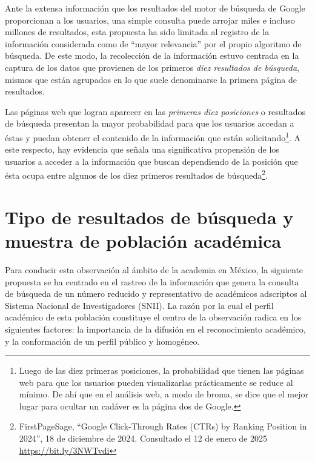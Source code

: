 \documentclass[
  spanish,
  11pt,
  a4paper,
]{scrbook}
\begin{document}

Ante la extensa información que los resultados del motor de búsqueda de
Google proporcionan a los usuarios, una simple consulta puede arrojar
miles e incluso millones de resultados, esta propuesta ha sido limitada
al registro de la información considerada como de ``mayor relevancia''
por el propio algoritmo de búsqueda. De este modo, la recolección de la
información estuvo centrada en la captura de los datos que provienen de
los primeros \emph{diez resultados de búsqueda}, mismos que están
agrupados en lo que suele denominarse la primera página de resultados.

Las páginas web que logran aparecer en las \emph{primeras diez
posiciones} o resultados de búsqueda presentan la mayor probabilidad
para que los usuarios accedan a éstas y puedan obtener el contenido de
la información que están solicitando\footnote{Luego de las diez primeras
  posiciones, la probabilidad que tienen las páginas web para que los
  usuarios pueden visualizarlas prácticamente se reduce al mínimo. De
  ahí que en el análisis web, a modo de broma, se dice que el mejor
  lugar para ocultar un cadáver es la página dos de Google.}. A este
respecto, hay evidencia que señala una significativa propensión de los
usuarios a acceder a la información que buscan dependiendo de la
posición que ésta ocupa entre algunos de los diez primeros resultados de
búsqueda\footnote{FirstPageSage, ``Google Click-Through Rates (CTRs) by
  Ranking Position in 2024'', 18 de diciembre de 2024. Consultado el 12
  de enero de 2025
  \href{https://bit.ly/3NWTvdi}{\ul{https://bit.ly/3NWTvdi}}}.

\section*{Tipo de resultados de búsqueda y muestra de población
académica}\label{tipo-de-resultados-de-buxfasqueda-y-muestra-de-poblaciuxf3n-acaduxe9mica}


Para conducir esta observación al ámbito de la academia en México, la
siguiente propuesta se ha centrado en el rastreo de la información que
genera la consulta de búsqueda de un número reducido y representativo de
académicos adscriptos al Sistema Nacional de Investigadores (SNII). La
razón por la cual el perfil académico de esta población constituye el
centro de la observación radica en los siguientes factores: la
importancia de la difusión en el reconocimiento académico, y la
conformación de un perfil público y homogéneo.
\end{document}
